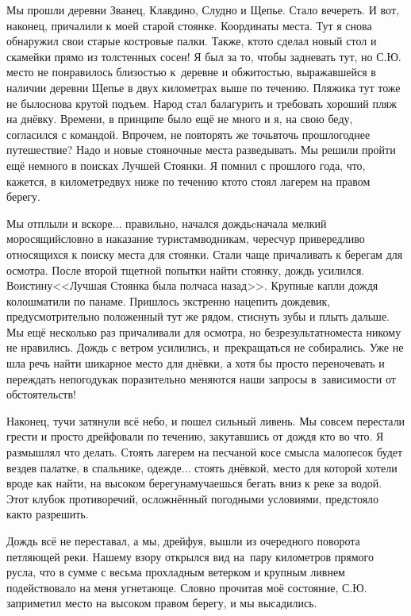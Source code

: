 Мы прошли деревни Званец, Клавдино, Слудно и Щепье. Стало вечереть. И вот, наконец, причалили к моей старой стоянке. Координаты места\mdash \CoordsChagodoschaFifteenSecondDnevka. Тут я снова обнаружил свои старые костровые палки. Также, кто\sdash то сделал новый стол и скамейки прямо из толстенных сосен! Я был за то, чтобы задневать тут, но С.Ю. место не понравилось близостью к~деревне и обжитостью, выражавшейся в наличии деревни Щепье в двух километрах выше по течению. Пляжика тут тоже не было\mdash снова крутой подъем. Народ стал балагурить и требовать хороший пляж на днёвку. Времени, в принципе было ещё не много и я, на свою беду, согласился с командой. Впрочем, не повторять же точь\sdash в\sdash точь прошлогоднее путешествие? Надо и новые стояночные места разведывать. Мы решили пройти ещё немного в поисках Лучшей Стоянки. Я помнил с прошлого года, что, кажется, в километре\sdash двух ниже по течению кто\sdash то стоял лагерем на правом берегу.

\newpage
Мы отплыли и вскоре$\ldots$ правильно, начался дождь\mdash cначала мелкий моросящий\mdash словно в наказание туристам\sdash водникам, чересчур привередливо относящихся к поиску места для стоянки. Стали чаще причаливать к берегам для осмотра. После второй тщетной попытки найти стоянку, дождь усилился. Воистину\mdash <<Лучшая Стоянка была полчаса назад>>. Крупные капли дождя колошматили по панаме. Пришлось экстренно нацепить дождевик, предусмотрительно положенный тут же рядом, стиснуть зубы и плыть дальше. Мы ещё несколько раз причаливали для осмотра, но безрезультатно\mdash места никому не нравились. Дождь с ветром усилились, и~прекращаться не собирались. Уже не шла речь найти шикарное место для днёвки, а хотя бы просто переночевать и переждать непогоду\mdash как поразительно меняются наши запросы в~зависимости от обстоятельств!

Наконец, тучи затянули всё небо, и пошел сильный ливень. Мы совсем перестали грести и просто дрейфовали по течению, закутавшись от дождя кто во что. Я размышлял что делать. Стоять лагерем на песчаной косе смысла мало\mdash песок будет везде\mdash в палатке, в спальнике, одежде$\ldots$ стоять днёвкой, место для которой хотели вроде как найти, на высоком берегу\mdash намучаешься бегать вниз к реке за водой. Этот клубок противоречий, осложнённый погодными условиями, предстояло как\sdash то разрешить. 

Дождь всё не переставал, а мы, дрейфуя, вышли из очередного поворота петляющей реки. Нашему взору открылся вид на~пару километров прямого русла, что в сумме с весьма прохладным ветерком и крупным ливнем подействовало на меня угнетающе. Словно прочитав моё состояние, С.Ю. заприметил место на высоком правом берегу, и мы высадились. 

